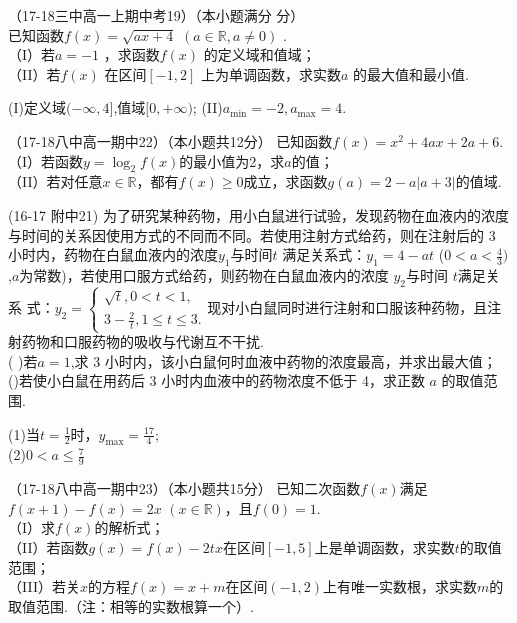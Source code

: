 \item
（17-18三中高一上期中考19）（本小题满分 分）\\
已知函数$f(x)=\sqrt{ax+4}$ $(a\in\mathbb{R},a\neq0)$  .\\
（I）若$a=-1$ ，求函数$f(x)$ 的定义域和值域；\\  
（II）若$f(x)$ 在区间$[-1,2] $ 上为单调函数，求实数$a$ 的最大值和最小值.\\
\begin{answer}
(I)定义域$(-\infty,4]$,值域$[0,+\infty)$;
(II)$a_{\min}=-2,a_{\max}=4 $.
\end{answer}





\item
（17-18八中高一期中22）（本小题共12分）
已知函数$f(x)=x^2+4ax+2a+6 $.\\
（I）若函数$y=\log_2f(x)$的最小值为2，求$a$的值；\\
（II）若对任意$x\in\mathbb{R}$，都有$f(x)\geq0$成立，求函数$g(a)=2-a|a+3| $的值域.\\

\item
(16-17 附中21) 为了研究某种药物，用小白鼠进行试验，发现药物在血液内的浓度与时间的关系因使用方式的不同而不同。若使用注射方式给药，则在注射后的 3 小时内，药物在白鼠血液内的浓度$y_1$与时间$t$ 满足关系式：$y_1 =4-at$ ($0<a<\frac{4}{3})$,$a$为常数)，若使用口服方式给药，则药物在白鼠血液内的浓度 $y_2$与时间 $t$满足关系 式：$y_2=\begin{cases}\sqrt{t},0<t<1,\\3-\frac{2}{t},1\leq t\leq3.\end{cases}$现对小白鼠同时进行注射和口服该种药物，且注射药物和口服药物的吸收与代谢互不干扰.\\
( )若$a=1$,求 3 小时内，该小白鼠何时血液中药物的浓度最高，并求出最大值；\\
()若使小白鼠在用药后 3 小时内血液中的药物浓度不低于 4，求正数 $a$ 的取值范围.\\
\begin{answer}
(1)当$t=\frac12$时，$y_{\max}=\frac{17}{4}$;\\
(2)$0<a\leq\frac{7}{9}$
\end{answer}


\item
（17-18八中高一期中23）（本小题共15分）
已知二次函数$f(x)$满足$f(x+1)-f(x)=2x $ $(x\in\mathbb{R})$，且$f(0)=1$.\\
（I）求$f(x)$的解析式；\\
（II）若函数$g(x)=f(x)-2tx$在区间$[-1,5]$上是单调函数，求实数$t$的取值范围；\\
（III）若关$x$的方程$f(x)=x+m $在区间$(-1,2)$上有唯一实数根，求实数$m$的取值范围.（注：相等的实数根算一个）.\\

